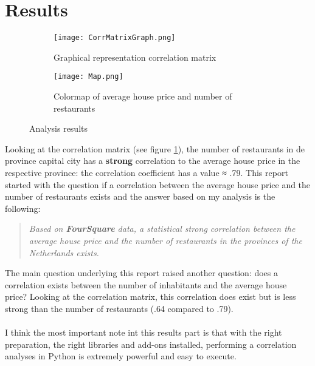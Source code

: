 \section{Results}
\medskip
\begin{figure}[H]
	\begin{subfigure}{0.5\textwidth}
		\centering
		\texttt{[image: CorrMatrixGraph.png]} 
		\caption{Graphical representation correlation matrix}
		\label{corrMatrixGraph}
	\end{subfigure}
	\begin{subfigure}{0.5\textwidth}
		\centering
		\texttt{[image: Map.png]}
		\caption{Colormap of average house price and number of restaurants}
	\end{subfigure}
	\caption{Analysis results}
\end{figure}
\medskip
Looking at the correlation matrix (see figure \ref{corrMatrixGraph}), the number of restaurants in de province capital city has a \textbf{strong} correlation to the average house price in the respective province: the correlation coefficient has a value ≈ .79. This report started with the question if a correlation between the average house price and the number of restaurants exists and the answer based on my analysis is the following:
\medskip
\begin{quote}
\textit{Based on \textbf{FourSquare} data, a statistical strong correlation between the average house price and the number of restaurants in the provinces of the Netherlands exists.}
\end{quote}
\medskip
The main question underlying this report raised another question: does a correlation exists between the number of inhabitants and the average house price? Looking at the correlation matrix, this correlation does exist but is less strong than the number of restaurants (.64 compared to .79). 
\\\\
I think the most important note int this results part is that with the right preparation, the right libraries and add-ons installed, performing a correlation analyses in Python is extremely powerful and easy to execute.